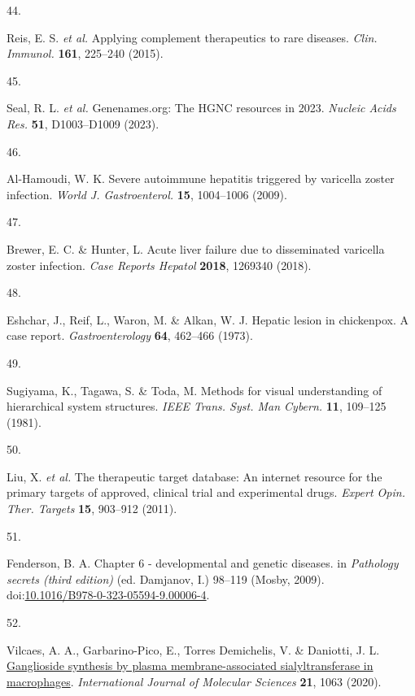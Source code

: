 \documentclass[
]{agujournal2019}
\newlength{\cslhangindent}
\newlength{\csllabelwidth}
\newenvironment{CSLReferences}[2] %
 {\begin{list}{}{%
  \setlength{\itemindent}{0pt}
  \setlength{\leftmargin}{0pt}
  \setlength{\parsep}{0pt}
  \ifodd #1
   \setlength{\leftmargin}{\cslhangindent}
   \setlength{\itemindent}{-1\cslhangindent}
  \fi
  \setlength{\itemsep}{#2\baselineskip}}}
 {\end{list}}
\newcommand{\CSLLeftMargin}[1]{\parbox[t]{\csllabelwidth}{\strut#1\strut}}
\newcommand{\CSLRightInline}[1]{\parbox[t]{\linewidth - \csllabelwidth}{\strut#1\strut}}
\begin{document}
\begin{CSLReferences}{0}{0}
\CSLLeftMargin{44. }%
\CSLRightInline{Reis, E. S. \emph{et al.} Applying complement
therapeutics to rare diseases. \emph{Clin. Immunol.} \textbf{161},
225--240 (2015).}

\CSLLeftMargin{45. }%
\CSLRightInline{Seal, R. L. \emph{et al.} Genenames.org: The {HGNC}
resources in 2023. \emph{Nucleic Acids Res.} \textbf{51}, D1003--D1009
(2023).}

\CSLLeftMargin{46. }%
\CSLRightInline{Al-Hamoudi, W. K. Severe autoimmune hepatitis triggered
by varicella zoster infection. \emph{World J. Gastroenterol.}
\textbf{15}, 1004--1006 (2009).}

\CSLLeftMargin{47. }%
\CSLRightInline{Brewer, E. C. \& Hunter, L. Acute liver failure due to
disseminated varicella zoster infection. \emph{Case Reports Hepatol}
\textbf{2018}, 1269340 (2018).}

\CSLLeftMargin{48. }%
\CSLRightInline{Eshchar, J., Reif, L., Waron, M. \& Alkan, W. J. Hepatic
lesion in chickenpox. A case report. \emph{Gastroenterology}
\textbf{64}, 462--466 (1973).}

\CSLLeftMargin{49. }%
\CSLRightInline{Sugiyama, K., Tagawa, S. \& Toda, M. Methods for visual
understanding of hierarchical system structures. \emph{IEEE Trans. Syst.
Man Cybern.} \textbf{11}, 109--125 (1981).}

\CSLLeftMargin{50. }%
\CSLRightInline{Liu, X. \emph{et al.} The therapeutic target database:
An internet resource for the primary targets of approved, clinical trial
and experimental drugs. \emph{Expert Opin. Ther. Targets} \textbf{15},
903--912 (2011).}

\CSLLeftMargin{51. }%
\CSLRightInline{Fenderson, B. A. Chapter 6 - developmental and genetic
diseases. in \emph{Pathology secrets (third edition)} (ed. Damjanov, I.)
98--119 (Mosby, 2009).
doi:\href{https://doi.org/10.1016/B978-0-323-05594-9.00006-4}{10.1016/B978-0-323-05594-9.00006-4}.}

\CSLLeftMargin{52. }%
\CSLRightInline{Vilcaes, A. A., Garbarino-Pico, E., Torres Demichelis,
V. \& Daniotti, J. L.
\href{https://doi.org/10.3390/ijms21031063}{Ganglioside synthesis by
plasma membrane-associated sialyltransferase in macrophages}.
\emph{International Journal of Molecular Sciences} \textbf{21}, 1063
(2020).}


\end{CSLReferences}
\end{document}
